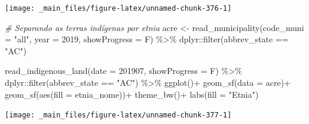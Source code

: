\documentclass[
  brazilian,
]{book}
\newenvironment{Shaded}{\begin{snugshade}}{\end{snugshade}}
\newcommand{\AttributeTok}[1]{\textcolor[rgb]{0.77,0.63,0.00}{#1}}
\newcommand{\CommentTok}[1]{\textcolor[rgb]{0.56,0.35,0.01}{\textit{#1}}}
\newcommand{\DecValTok}[1]{\textcolor[rgb]{0.00,0.00,0.81}{#1}}
\newcommand{\FunctionTok}[1]{\textcolor[rgb]{0.00,0.00,0.00}{#1}}
\newcommand{\NormalTok}[1]{#1}
\newcommand{\OtherTok}[1]{\textcolor[rgb]{0.56,0.35,0.01}{#1}}
\newcommand{\SpecialCharTok}[1]{\textcolor[rgb]{0.00,0.00,0.00}{#1}}
\newcommand{\StringTok}[1]{\textcolor[rgb]{0.31,0.60,0.02}{#1}}
\begin{document}
\begin{center}\texttt{[image: \_main\_files/figure-latex/unnamed-chunk-376-1]} \end{center}

\begin{Shaded}
\begin{Highlighting}[]
\CommentTok{\# Separando as terras indígenas por etnia}
\NormalTok{acre }\OtherTok{\textless{}{-}} \FunctionTok{read\_municipality}\NormalTok{(}\AttributeTok{code\_muni =} \StringTok{"all"}\NormalTok{,}
                          \AttributeTok{year =} \DecValTok{2019}\NormalTok{,}
                          \AttributeTok{showProgress =}\NormalTok{ F) }\SpecialCharTok{\%\textgreater{}\%} 
\NormalTok{  dplyr}\SpecialCharTok{::}\FunctionTok{filter}\NormalTok{(abbrev\_state }\SpecialCharTok{==} \StringTok{"AC"}\NormalTok{)}

\FunctionTok{read\_indigenous\_land}\NormalTok{(}\AttributeTok{date =} \DecValTok{201907}\NormalTok{,}
                     \AttributeTok{showProgress =}\NormalTok{ F) }\SpecialCharTok{\%\textgreater{}\%} 
\NormalTok{  dplyr}\SpecialCharTok{::}\FunctionTok{filter}\NormalTok{(abbrev\_state }\SpecialCharTok{==} \StringTok{"AC"}\NormalTok{) }\SpecialCharTok{\%\textgreater{}\%} 
  \FunctionTok{ggplot}\NormalTok{()}\SpecialCharTok{+}
  \FunctionTok{geom\_sf}\NormalTok{(}\AttributeTok{data =}\NormalTok{ acre)}\SpecialCharTok{+}
  \FunctionTok{geom\_sf}\NormalTok{(}\FunctionTok{aes}\NormalTok{(}\AttributeTok{fill =}\NormalTok{ etnia\_nome))}\SpecialCharTok{+}
  \FunctionTok{theme\_bw}\NormalTok{()}\SpecialCharTok{+}
  \FunctionTok{labs}\NormalTok{(}\AttributeTok{fill =} \StringTok{"Etnia"}\NormalTok{)}
\end{Highlighting}
\end{Shaded}

\begin{center}\texttt{[image: \_main\_files/figure-latex/unnamed-chunk-377-1]} \end{center}
\end{document}
